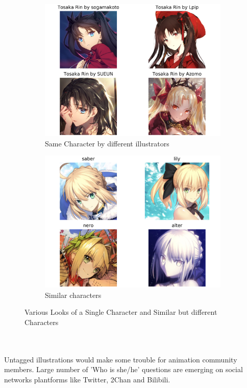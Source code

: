 \documentclass[11.5pt]{article}
\begin{document}
    \begin{figure}[!ht]
        \begin{subfigure}[h]{0.5\linewidth}
            \centering
            \includegraphics[width=0.8\linewidth, scale=1]{./images/tosaka_grid.png}
            \caption{Same Character by different illustrators}
        \end{subfigure}
        \begin{subfigure}[h]{0.5\linewidth}
            \centering
            \includegraphics[width=0.8\linewidth, scale=1]{./images/saber_grid.png}
            \caption{Similar characters}
        \end{subfigure}
        \caption{Various Looks of a Single Character and Similar but different Characters}
    \end{figure}
    \\ \\
    Untagged illustrations would make some trouble for animation community members.
    Large number of 'Who is she/he' questions are emerging on social networks plantforms like Twitter, 2Chan and Bilibili.
\end{document}
